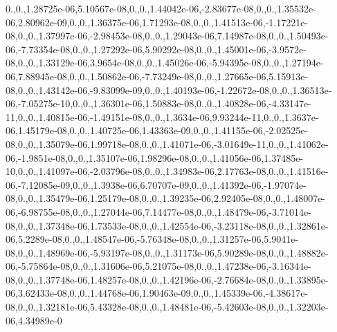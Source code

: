 \begin{DoxyCompactItemize}
0.,0.,1.\-28725e-\/06,5.\-10567e-\/08,0.,0.,1.\-44042e-\/06,-\/2.\-83677e-\/08,0.,0.,1.\-35532e-\/06,2.\-80962e-\/09,0.,0.,1.\-36375e-\/06,1.\-71293e-\/08,0.,0.,1.\-41513e-\/06,-\/1.\-17221e-\/08,0.,0.,1.\-37997e-\/06,-\/2.\-98453e-\/08,0.,0.,1.\-29043e-\/06,7.\-14987e-\/08,0.,0.,1.\-50493e-\/06,-\/7.\-73354e-\/08,0.,0.,1.\-27292e-\/06,5.\-90292e-\/08,0.,0.,1.\-45001e-\/06,-\/3.\-9572e-\/08,0.,0.,1.\-33129e-\/06,3.\-9654e-\/08,0.,0.,1.\-45026e-\/06,-\/5.\-94395e-\/08,0.,0.,1.\-27194e-\/06,7.\-88945e-\/08,0.,0.,1.\-50862e-\/06,-\/7.\-73249e-\/08,0.,0.,1.\-27665e-\/06,5.\-15913e-\/08,0.,0.,1.\-43142e-\/06,-\/9.\-83099e-\/09,0.,0.,1.\-40193e-\/06,-\/1.\-22672e-\/08,0.,0.,1.\-36513e-\/06,-\/7.\-05275e-\/10,0.,0.,1.\-36301e-\/06,1.\-50883e-\/08,0.,0.,1.\-40828e-\/06,-\/4.\-33147e-\/11,0.,0.,1.\-40815e-\/06,-\/1.\-49151e-\/08,0.,0.,1.\-3634e-\/06,9.\-93244e-\/11,0.,0.,1.\-3637e-\/06,1.\-45179e-\/08,0.,0.,1.\-40725e-\/06,1.\-43363e-\/09,0.,0.,1.\-41155e-\/06,-\/2.\-02525e-\/08,0.,0.,1.\-35079e-\/06,1.\-99718e-\/08,0.,0.,1.\-41071e-\/06,-\/3.\-01649e-\/11,0.,0.,1.\-41062e-\/06,-\/1.\-9851e-\/08,0.,0.,1.\-35107e-\/06,1.\-98296e-\/08,0.,0.,1.\-41056e-\/06,1.\-37485e-\/10,0.,0.,1.\-41097e-\/06,-\/2.\-03796e-\/08,0.,0.,1.\-34983e-\/06,2.\-17763e-\/08,0.,0.,1.\-41516e-\/06,-\/7.\-12085e-\/09,0.,0.,1.\-3938e-\/06,6.\-70707e-\/09,0.,0.,1.\-41392e-\/06,-\/1.\-97074e-\/08,0.,0.,1.\-35479e-\/06,1.\-25179e-\/08,0.,0.,1.\-39235e-\/06,2.\-92405e-\/08,0.,0.,1.\-48007e-\/06,-\/6.\-98755e-\/08,0.,0.,1.\-27044e-\/06,7.\-14477e-\/08,0.,0.,1.\-48479e-\/06,-\/3.\-71014e-\/08,0.,0.,1.\-37348e-\/06,1.\-73533e-\/08,0.,0.,1.\-42554e-\/06,-\/3.\-23118e-\/08,0.,0.,1.\-32861e-\/06,5.\-2289e-\/08,0.,0.,1.\-48547e-\/06,-\/5.\-76348e-\/08,0.,0.,1.\-31257e-\/06,5.\-9041e-\/08,0.,0.,1.\-48969e-\/06,-\/5.\-93197e-\/08,0.,0.,1.\-31173e-\/06,5.\-90289e-\/08,0.,0.,1.\-48882e-\/06,-\/5.\-75864e-\/08,0.,0.,1.\-31606e-\/06,5.\-21075e-\/08,0.,0.,1.\-47238e-\/06,-\/3.\-16344e-\/08,0.,0.,1.\-37748e-\/06,1.\-48257e-\/08,0.,0.,1.\-42196e-\/06,-\/2.\-76684e-\/08,0.,0.,1.\-33895e-\/06,3.\-62433e-\/08,0.,0.,1.\-44768e-\/06,1.\-90463e-\/09,0.,0.,1.\-45339e-\/06,-\/4.\-38617e-\/08,0.,0.,1.\-32181e-\/06,5.\-43328e-\/08,0.,0.,1.\-48481e-\/06,-\/5.\-42603e-\/08,0.,0.,1.\-32203e-\/06,4.\-34989e-\/0
\end{DoxyCompactItemize}
